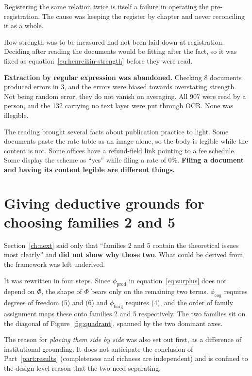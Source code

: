 Registering the same relation twice is itself a failure in operating the pre-registration. The
cause was keeping the register by chapter and never reconciling it as a whole.

How strength was to be measured had not been laid down at registration. Deciding after reading the
documents would be fitting after the fact, so it was fixed as
equation~\eqref{eq:henreikin-strength} before they were read.

\textbf{Extraction by regular expression was abandoned.} Checking 8 documents produced errors in 3,
and the errors were biased towards overstating strength. Not being random error, they do not vanish
on averaging. All 907 were read by a person, and the 132 carrying no text layer were put through
OCR. None was illegible.

The reading brought several facts about publication practice to light. Some documents paste the
rate table as an image alone, so the body is legible while the content is not. Some offices have a
refund-field link pointing to a fee schedule. Some display the scheme as ``yes'' while filing a
rate of 0\%. \textbf{Filing a document and having its content legible are different things.}

\section{Giving deductive grounds for choosing families 2 and 5}

Section~\ref{ch:next} said only that ``families 2 and 5 contain the theoretical issues most
clearly'' and \textbf{did not show why those two}. What could be derived from the framework was
left underived.

It was rewritten in four steps. Since $\phi_{\mathrm{prod}}$ in equation~\eqref{eq:surplus} does
not depend on $\Phi$, the shape of $\Phi$ bears only on the remaining two terms.
$\phi_{\mathrm{cog}}$ requires degrees of freedom (5) and (6) and $\phi_{\mathrm{barg}}$ requires
(4), and the order of family assignment maps these onto families 2 and 5 respectively. The two
families sit on the diagonal of Figure~\ref{fig:quadrant}, spanned by the two dominant axes.

The reason for \emph{placing them side by side} was also set out first, as a difference of
institutional grounding. It does not anticipate the conclusion of Part~\ref{part:results}
(completeness and richness are independent) and is confined to the design-level reason that the two
need separating.

